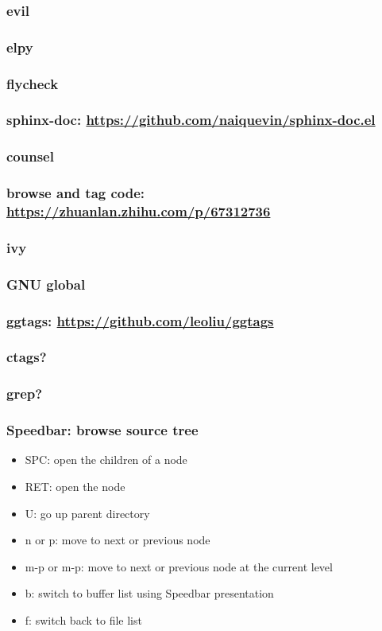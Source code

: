 \documentclass[11pt]{article}
\begin{document}
\subsubsection{evil}
\label{sec:org21b883b}
\subsubsection{elpy}
\label{sec:org432f3a5}
\subsubsection{flycheck}
\label{sec:org2009ceb}
\subsubsection{sphinx-doc: \url{https://github.com/naiquevin/sphinx-doc.el}}
\label{sec:org8e6ca7b}
\subsubsection{counsel}
\label{sec:org01c34ff}
\subsubsection{browse and tag code: \url{https://zhuanlan.zhihu.com/p/67312736}}
\label{sec:org381f439}

\subsubsection{ivy}
\label{sec:org377499e}
\subsubsection{GNU global}
\label{sec:org8117b66}
\subsubsection{ggtags: \url{https://github.com/leoliu/ggtags}}
\label{sec:org053109d}
\subsubsection{ctags?}
\label{sec:orgaa67e35}
\subsubsection{grep?}
\label{sec:orgec23ac5}
\subsubsection{Speedbar: browse source tree}
\label{sec:org5c96d04}
\begin{itemize}
\item SPC: open the children of a node
\item RET: open the node
\item U: go up parent directory
\item n or p: move to next or previous node
\item m-p or m-p: move to next or previous node at the current level
\item b: switch to buffer list using Speedbar presentation
\item f: switch back to file list
\end{itemize}
\end{document}

